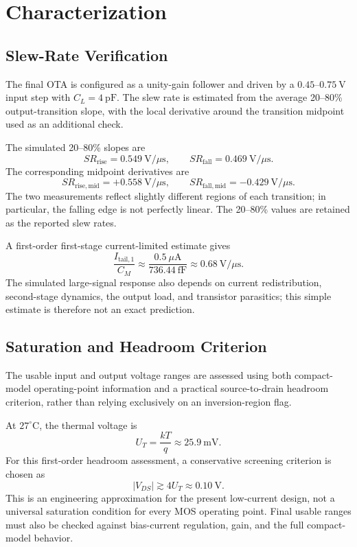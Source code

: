 
\section{Characterization}

\subsection{Slew-Rate Verification}

The final OTA is configured as a unity-gain follower and driven by a
$0.45$--$0.75~\mathrm{V}$ input step with $C_L=4~\mathrm{pF}$.
The slew rate is estimated from the average 20--80\% output-transition
slope, with the local derivative around the transition midpoint used as
an additional check.

The simulated 20--80\% slopes are
\[
\boxed{SR_{\mathrm{rise}}=0.549~\mathrm{V}/\mu\mathrm{s}},
\qquad
\boxed{SR_{\mathrm{fall}}=0.469~\mathrm{V}/\mu\mathrm{s}}.
\]
The corresponding midpoint derivatives are
\[
SR_{\mathrm{rise,mid}}=+0.558~\mathrm{V}/\mu\mathrm{s},
\qquad
SR_{\mathrm{fall,mid}}=-0.429~\mathrm{V}/\mu\mathrm{s}.
\]
The two measurements reflect slightly different regions of each
transition; in particular, the falling edge is not perfectly linear.
The 20--80\% values are retained as the reported slew rates.

A first-order first-stage current-limited estimate gives
\[
\frac{I_{\mathrm{tail,1}}}{C_M}
\approx\frac{0.5~\mu\mathrm{A}}{736.44~\mathrm{fF}}
\approx0.68~\mathrm{V}/\mu\mathrm{s}.
\]
The simulated large-signal response also depends on current
redistribution, second-stage dynamics, the output load, and transistor
parasitics; this simple estimate is therefore not an exact prediction.

\subsection{Saturation and Headroom Criterion}

The usable input and output voltage ranges are assessed using both
compact-model operating-point information and a practical
source-to-drain headroom criterion, rather than relying exclusively on
an inversion-region flag.

At $27^\circ\mathrm{C}$, the thermal voltage is
\[
U_T=\frac{kT}{q}\approx25.9~\mathrm{mV}.
\]
For this first-order headroom assessment, a conservative screening
criterion is chosen as
\[
\boxed{|V_{DS}|\gtrsim4U_T\approx0.10~\mathrm{V}}.
\]
This is an engineering approximation for the present low-current design,
not a universal saturation condition for every MOS operating point.
Final usable ranges must also be checked against bias-current
regulation, gain, and the full compact-model behavior.

